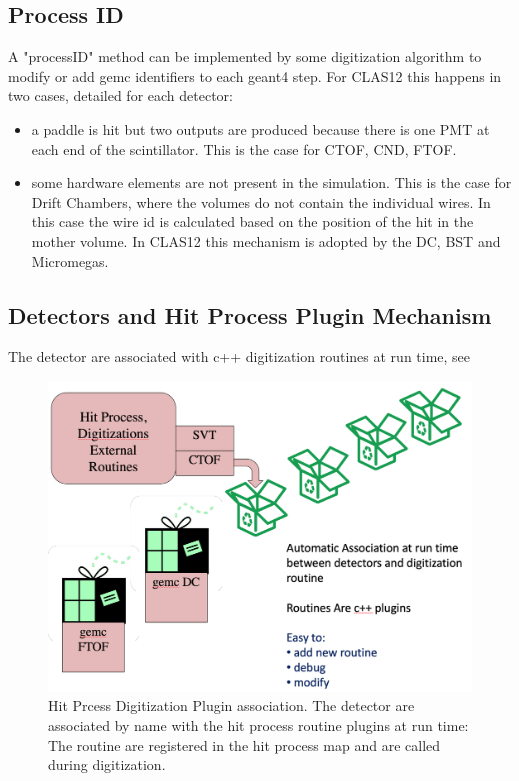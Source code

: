 \subsection{Process ID}

A "processID" method can be implemented by some digitization algorithm to modify or add gemc identifiers to each geant4 step. For CLAS12 this happens in two
cases, detailed for each detector:

\begin{itemize}
	\item a paddle is hit but two outputs are produced because there is one PMT at each end of the scintillator. This
          is the case for CTOF, CND, FTOF.
    \item some hardware elements are not present in the simulation. This is the case for Drift Chambers, where the volumes do not contain
          the individual wires. In this case the wire id is calculated based on the position of the hit in the mother volume. In CLAS12 this mechanism
          is adopted by the DC, BST and Micromegas.
\end{itemize}


\subsection{Detectors and Hit Process Plugin Mechanism}
The detector are associated with c++ digitization routines at run time, see 

\begin{figure}
	\centering
	\includegraphics[width=0.95\columnwidth,keepaspectratio]{img/pluginsAssociation.png}
	\caption{Hit Prcess Digitization Plugin association. The detector are associated by name with the hit process routine plugins at run time:
			 The routine are registered in the hit process map and are called during digitization.}
	\label{fig:pluginsAssociation}
\end{figure}

